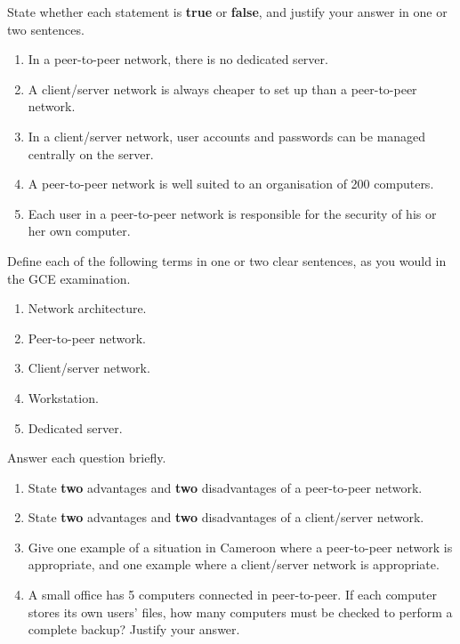 \documentclass[11pt]{article}
\begin{document}
\begin{exercice}
State whether each statement is \textbf{true} or \textbf{false}, and justify your answer in one or two sentences.
\begin{enumerate}
\item In a peer-to-peer network, there is no dedicated server.
\item A client/server network is always cheaper to set up than a peer-to-peer network.
\item In a client/server network, user accounts and passwords can be managed centrally on the server.
\item A peer-to-peer network is well suited to an organisation of 200 computers.
\item Each user in a peer-to-peer network is responsible for the security of his or her own computer.
\end{enumerate}
\end{exercice}

\begin{exercice}[Definitions]
Define each of the following terms in one or two clear sentences, as you would in the GCE examination.
\begin{enumerate}
\item Network architecture.
\item Peer-to-peer network.
\item Client/server network.
\item Workstation.
\item Dedicated server.
\end{enumerate}
\end{exercice}

\begin{exercice}
Answer each question briefly.
\begin{enumerate}
\item State \textbf{two} advantages and \textbf{two} disadvantages of a peer-to-peer network.
\item State \textbf{two} advantages and \textbf{two} disadvantages of a client/server network.
\item Give one example of a situation in Cameroon where a peer-to-peer network is appropriate, and one example where a client/server network is appropriate.
\item A small office has 5 computers connected in peer-to-peer. If each computer stores its own users' files, how many computers must be checked to perform a complete backup? Justify your answer.
\end{enumerate}
\end{exercice}
\end{document}
